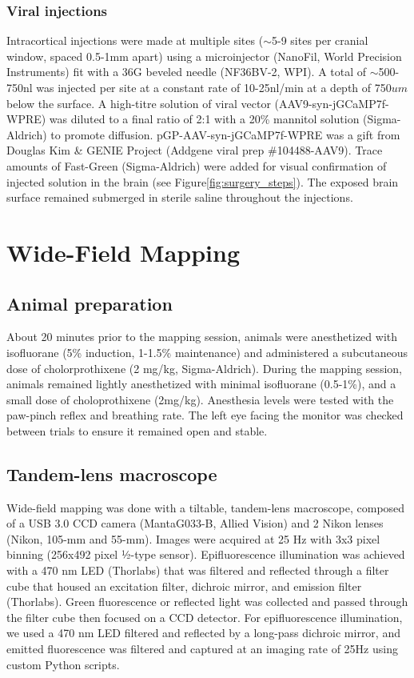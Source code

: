 \subsubsection{Viral injections}
Intracortical injections were made at multiple sites ($\sim$5-9 sites per cranial window, spaced 0.5-1mm apart) using a microinjector (NanoFil, World Precision Instruments) fit with a 36G beveled needle (NF36BV-2, WPI). A total of $\sim$500-750nl was injected per site at a constant rate of 10-25nl/min at a depth of 750$um$ below the surface. A high-titre solution of viral vector (AAV9-syn-jGCaMP7f-WPRE) was diluted to a final ratio of 2:1 with a 20\% mannitol solution (Sigma-Aldrich) to promote diffusion. pGP-AAV-syn-jGCaMP7f-WPRE was a gift from Douglas Kim \& GENIE Project (Addgene viral prep \#104488-AAV9). Trace amounts of Fast-Green (Sigma-Aldrich) were added for visual confirmation of injected solution in the brain (see Figure\ref{fig:surgery_steps}). The exposed brain surface remained submerged in sterile saline throughout the injections.

\section{Wide-Field Mapping}
\subsection{Animal preparation}
About 20 minutes prior to the mapping session, animals were anesthetized with isofluorane (5\% induction, 1-1.5\% maintenance) and administered a subcutaneous dose of cholorprothixene (2 mg/kg, Sigma-Aldrich). During the mapping session, animals remained lightly anesthetized with minimal isofluorane (0.5-1\%), and a small dose of choloprothixene (2mg/kg). Anesthesia levels were tested with the paw-pinch reflex and breathing rate. The left eye facing the monitor was checked between trials to ensure it remained open and stable. 

\subsection{Tandem-lens macroscope}
Wide-field mapping was done with a tiltable, tandem-lens macroscope\cite{Ratzlaff1991, Kalatsky2003}, composed of a USB 3.0 CCD camera (MantaG033-B, Allied Vision) and 2 Nikon lenses (Nikon, 105-mm and 55-mm). Images were acquired at 25 Hz with 3x3 pixel binning (256x492 pixel ½-type sensor). Epifluorescence illumination was achieved with a 470 nm LED (Thorlabs) that was filtered and reflected through a filter cube that housed an excitation filter, dichroic mirror, and emission filter (Thorlabs). Green fluorescence or reflected light was collected and passed through the filter cube then focused on a CCD detector. For epifluorescence illumination, we used a 470 nm LED filtered and reflected by a long-pass dichroic mirror, and emitted fluorescence was filtered and captured at an imaging rate of 25Hz using custom Python scripts.

